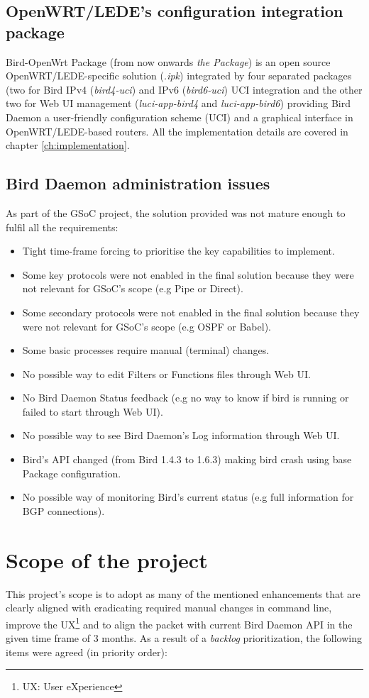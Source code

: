 \subsection{OpenWRT/LEDE's configuration integration package}
Bird-OpenWrt Package (from now onwards \textit{the Package}) is an open source OpenWRT/LEDE-specific solution (\textit{.ipk}) integrated by four separated packages (two for Bird IPv4 (\textit{bird4-uci}) and IPv6 (\textit{bird6-uci}) UCI integration and the other two for Web UI management (\textit{luci-app-bird4} and \textit{luci-app-bird6}) providing Bird Daemon a user-friendly configuration scheme (UCI) and a graphical interface in OpenWRT/LEDE-based routers. All the implementation details are covered in chapter \ref{ch:implementation}.

\subsection{Bird Daemon administration issues}
\label{subsec:bdai}
As part of the GSoC project, the solution provided was not mature enough to fulfil all the requirements:
\begin{itemize}
    \item Tight time-frame forcing to prioritise the key capabilities to implement.
    \item Some key protocols were not enabled in the final solution because they were not relevant for GSoC's scope (e.g Pipe or Direct).
    \item Some secondary protocols were not enabled in the final solution because they were not relevant for GSoC's scope (e.g OSPF or Babel).
    \item Some basic processes require manual (terminal) changes.
    \item No possible way to edit Filters or Functions files through Web UI.
    \item No Bird Daemon Status feedback (e.g no way to know if bird is running or failed to start through Web UI).
    \item No possible way to see Bird Daemon's Log information through Web UI.
    \item Bird's API changed (from Bird 1.4.3 to 1.6.3) making bird crash using base Package configuration.
    \item No possible way of monitoring Bird's current status (e.g full information for BGP connections).
\end{itemize}
\section{Scope of the project}
\label{sec:sotp}
This project's scope is to adopt as many of the mentioned enhancements that are clearly aligned with eradicating required manual changes in command line, improve the UX\footnote{UX: User eXperience} and to align the packet with current Bird Daemon API in the given time frame of 3 months. As a result of a \textit{backlog} prioritization, the following items were agreed (in priority order):

